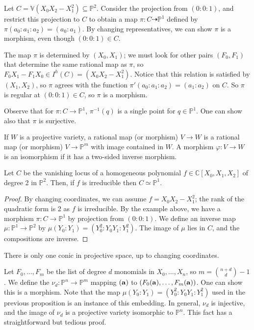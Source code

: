 \begin{example}
    Let \( C = \mathbb V(X_0 X_2 - X_1^2) \subseteq \mathbb P^2 \).
    Consider the projection from \( (0 : 0 : 1) \), and restrict this projection to \( C \) to obtain a map \( \pi \colon C \dashrightarrow \mathbb P^1 \) defined by \( \pi(a_0:a_1:a_2) = (a_0:a_1) \).
    By changing representatives, we can show \( \pi \) is a morphism, even though \( (0 : 0 : 1) \in C \).

    The map \( \pi \) is determined by \( (X_0, X_1) \); we must look for other pairs \( (F_0, F_1) \) that determine the same rational map as \( \pi \), so \( F_0 X_1 - F_1 X_0 \in I^h(C) = (X_0 X_2 - X_1^2) \).
    Notice that this relation is satisfied by \( (X_1, X_2) \), so \( \pi \) agrees with the function \( \pi'(a_0:a_1:a_2) = (a_1:a_2) \) on \( C \).
    So \( \pi \) is regular at \( (0 : 0 : 1) \in C \), so \( \pi \) is a morphism.

    Observe that for \( \pi \colon C \to \mathbb P^1 \), \( \pi^{-1}(q) \) is a single point for \( q \in \mathbb P^1 \).
    One can show also that \( \pi \) is surjective.
\end{example}
If \( W \) is a projective variety, a rational map (or morphism) \( V \to W \) is a rational map (or morphism) \( V \to \mathbb P^m \) with image contained in \( W \).
A morphism \( \varphi \colon V \to W \) is an isomorphism if it has a two-sided inverse morphism.
\begin{proposition}
    Let \( C \) be the vanishing locus of a homogeneous polynomial \( f \in \mathbb C[X_0, X_1, X_2] \) of degree 2 in \( \mathbb P^2 \).
    Then, if \( f \) is irreducible then \( C \simeq \mathbb P^1 \).
\end{proposition}
\begin{proof}
    By changing coordinates, we can assume \( f = X_0 X_2 - X_1^2 \); the rank of the quadratic form is 2 as \( f \) is irreducible.
    By the example above, we have a morphism \( \pi \colon C \to \mathbb P^1 \) by projection from \( (0 : 0 : 1) \).
    We define an inverse map \( \mu \colon \mathbb P^1 \to \mathbb P^2 \) by \( \mu(Y_0 : Y_1) = (Y_0^2 : Y_0 Y_1 : Y_1^2) \).
    The image of \( \mu \) lies in \( C \), and the compositions are inverse.
\end{proof}
There is only one conic in projective space, up to changing coordinates.
\begin{example}
    Let \( F_0, \dots, F_m \) be the list of degree \( d \) monomials in \( X_0, \dots, X_n \), so \( m = \binom{n+d}{d} - 1 \).
    We define the \( \nu_d \colon \mathbb P^n \to \mathbb P^m \) mapping \( (\vb a) \) to \( (F_0(\vb a), \dots, F_m(\vb a)) \).
    One can show this is a morphism.
    Note that the map \( \mu(Y_0 : Y_1) = (Y_0^2 : Y_0 Y_1 : Y_1^2) \) used in the previous proposition is an instance of this embedding.
    In general, \( \nu_d \) is injective, and the image of \( \nu_d \) is a projective variety isomorphic to \( \mathbb P^n \).
    This fact has a straightforward but tedious proof.
\end{example}
